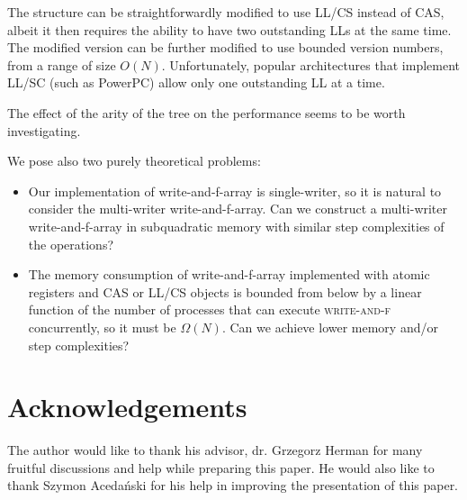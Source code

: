\documentclass{thesis}
\newcommand{\fn}[1]{\textsc{#1}}
\begin{document}
The structure can be straightforwardly modified to use LL/CS instead of CAS, albeit it then requires the ability to have two outstanding LLs at the same time. The modified version can be further modified to use
bounded version numbers, from a range of size $O(N)$. Unfortunately, popular architectures that implement LL/SC (such as PowerPC) allow only one outstanding LL at a time.

The effect of the arity of the tree on the performance
seems to be worth investigating.

We pose also two purely theoretical problems:

\begin{itemize}
	\item Our implementation of write-and-f-array is single-writer, so it is natural to consider the multi-writer write-and-f-array. Can we construct a multi-writer write-and-f-array in subquadratic memory with similar step complexities of the operations?

	\item The memory consumption of write-and-f-array implemented with atomic registers and CAS or LL/CS objects is bounded from below by a linear function of the number of processes that can execute \fn{write-and-f} concurrently\cite{lowerbound}, so it must be $\Omega(N)$. Can we achieve lower memory and/or step complexities?
\end{itemize}

\begingroup\let\clearpage\relax\chapter{Acknowledgements}\endgroup
The author would like to thank his advisor, dr. Grzegorz Herman for many fruitful discussions and help while preparing this paper. He would also like to thank Szymon Acedański for his help in improving the presentation of this paper.
\end{document}
